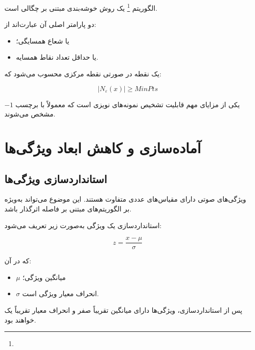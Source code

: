الگوریتم
\footnote{}
یک روش خوشه‌بندی مبتنی بر چگالی است.

دو پارامتر اصلی آن عبارت‌اند از:

\begin{itemize}
	\item {} یا شعاع همسایگی؛
	\item {} یا حداقل تعداد نقاط همسایه.
\end{itemize}

یک نقطه در صورتی نقطه مرکزی محسوب می‌شود که:

\begin{equation}
|N_{\varepsilon}(x)|
\geq
MinPts
\end{equation}

یکی از مزایای مهم
قابلیت تشخیص نمونه‌های نویزی است که معمولاً با برچسب $-1$ مشخص می‌شوند.

\section{آماده‌سازی و کاهش ابعاد ویژگی‌ها}


\subsection{استانداردسازی ویژگی‌ها}

ویژگی‌های صوتی دارای مقیاس‌های عددی متفاوت هستند. این موضوع می‌تواند به‌ویژه بر الگوریتم‌های مبتنی بر فاصله اثرگذار باشد.

استانداردسازی یک ویژگی به‌صورت زیر تعریف می‌شود:

\begin{equation}
z
=
\frac{x-\mu}{\sigma}
\end{equation}

که در آن:

\begin{itemize}
	\item $\mu$ میانگین ویژگی؛
	\item $\sigma$ انحراف معیار ویژگی است.
\end{itemize}

پس از استانداردسازی، ویژگی‌ها دارای میانگین تقریباً صفر و انحراف معیار تقریباً یک خواهند بود.


